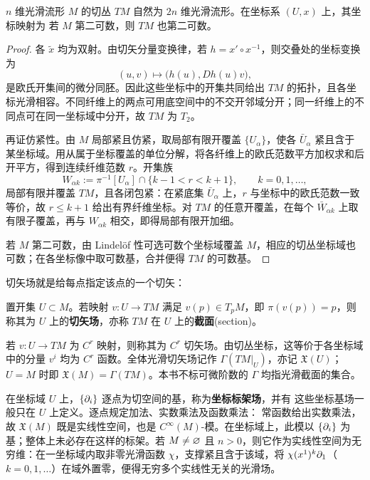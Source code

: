 \begin{theorem}
    $n$ 维光滑流形 $M$ 的切丛 $TM$ 自然为 $2n$ 维光滑流形。在坐标系 $(U,x)$ 上，其坐标映射为
    若 $M$ 第二可数，则 $TM$ 也第二可数。
\end{theorem}
\begin{proof}
    各 $\widetilde x$ 均为双射。由切矢分量变换律，若 $h=x'\circ x^{-1}$，则交叠处的坐标变换为
    \[
        (u,v)\longmapsto\bigl(h(u),Dh(u)v\bigr),
    \]
    是欧氏开集间的微分同胚。因此这些坐标中的开集共同给出 $TM$ 的拓扑，且各坐标光滑相容。不同纤维上的两点可用底空间中的不交开邻域分开；同一纤维上的不同点可在同一坐标域中分开，故 $TM$ 为 $T_2$。

    再证仿紧性。由 $M$ 局部紧且仿紧，取局部有限开覆盖 $\{U_\alpha\}$，使各 $\bar U_\alpha$ 紧且含于某坐标域。用从属于坐标覆盖的单位分解，将各纤维上的欧氏范数平方加权求和后开平方，得到连续纤维范数 $r$。开集族
    \[
        W_{\alpha k}:=\pi^{-1}[U_\alpha]\cap\{k-1<r<k+1\},\qquad k=0,1,\ldots,
    \]
    局部有限并覆盖 $TM$，且各闭包紧：在紧底集 $\bar U_\alpha$ 上，$r$ 与坐标中的欧氏范数一致等价，故 $r\leqslant k+1$ 给出有界纤维坐标。对 $TM$ 的任意开覆盖，在每个 $\bar W_{\alpha k}$ 上取有限子覆盖，再与 $W_{\alpha k}$ 相交，即得局部有限开加细。

    若 $M$ 第二可数，由 Lindel\"of 性可选可数个坐标域覆盖 $M$，相应的切丛坐标域也可数；在各坐标像中取可数基，合并便得 $TM$ 的可数基。
\end{proof}

切矢场就是给每点指定该点的一个切矢：
\begin{definition}
    置开集 $U\subset M$。若映射 $v:U\to TM$ 满足 $v(p)\in T_pM$，即 $\pi(v(p))=p$，则称其为 $U$ 上的\textbf{切矢场}，亦称 $TM$ 在 $U$ 上的\textbf{截面}(section)。

    若 $v:U\to TM$ 为 $C^r$ 映射，则称其为 $C^r$ 切矢场。由切丛坐标，这等价于各坐标域中的分量 $v^i$ 均为 $C^r$ 函数。全体光滑切矢场记作 $\Gamma(TM|_U)$，亦记 $\mathfrak X(U)$；$U=M$ 时即 $\mathfrak X(M)=\Gamma(TM)$。本书不标可微阶数的 $\Gamma$ 均指光滑截面的集合。
\end{definition}

在坐标域 $U$ 上，$\{\partial_i\}$ 逐点为切空间的基，称为\textbf{坐标标架场}，并有
这些坐标基场一般只在 $U$ 上定义。逐点规定加法、实数乘法及函数乘法：
常函数给出实数乘法，故 $\mathfrak X(M)$ 既是实线性空间，也是 $C^\infty(M)$-模。在坐标域上，此模以 $\{\partial_i\}$ 为基；整体上未必存在这样的标架。若 $M\ne\varnothing$ 且 $n>0$，则它作为实线性空间为无穷维：在一坐标域内取非零光滑函数 $\chi$，支撑紧且含于该域，将 $\chi(x^1)^k\partial_1$（$k=0,1,\ldots$）在域外置零，便得无穷多个实线性无关的光滑场。


